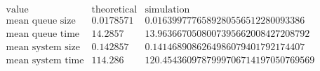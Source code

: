 \[\begin{array}{cccc}
 \text{value} & \text{theoretical} & \text{simulation} & \text{} \\
 \text{mean queue size} & 0.0178571 & 0.0163997776589280556512280093386 & \text{} \\
 \text{mean queue time} & 14.2857 & 13.9636670508007395662008427208792 & \text{} \\
 \text{mean system size} & 0.142857 & 0.1414689086264986079401792174407 & \text{} \\
 \text{mean system time} & 114.286 & 120.4543609787999706714197050769569 & \text{} \\
\end{array}\]

